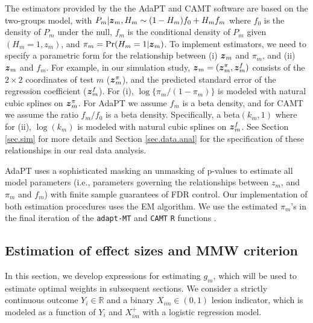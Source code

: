 \documentclass[bimj,fleqn]{w-art}
\newcommand{\mbf}[1]{\mbox{\boldmath${#1}$}}
\theoremstyle{plain}
\theoremstyle{definition}
\begin{document}
The estimators provided by the the AdaPT and CAMT software are based on the two-groups model, with $P_m|\mbf{z}_m,H_m \sim (1-H_m)f_0 + H_mf_m$ where $f_0$ is the density of $P_m$ under the null, $f_m$ is the conditional density of $P_m$ given $(H_m=1,z_m)$, and $\pi_m = \Pr(H_m=1|\mbf{z}_m)$. To implement estimators, we need to specify a parametric form for the relationship between (i) $\mbf{z}_m$ and $\pi_m$, and (ii) $\mbf{z}_m$ and $f_m$. For example, in our simulation study, $\mbf{z}_m = (\mbf{z}^\pi_{m},\mbf{z}^f_{m})$ consists of the $2\times 2$ coordinates of test $m$ ($\mbf{z}^\pi_{m}$), and the predicted standard error of the regression coefficient ($ \mbf{z}^f_{m}$). For (i), $\log\{\pi_m/(1-\pi_m)\}$ is modeled with natural cubic splines on $\mbf{z}^\pi_{m}$. For AdaPT we assume $f_m$ is a beta density, and for CAMT we assume the ratio $f_m/f_0$ is a beta density. Specifically, a beta$(k_m,1)$ where for (ii), $\log(k_m)$ is modeled with natural cubic splines on $\mbf{z}^f_{m}$. See Section \ref{sec.sim} for more details and Section \ref{sec.data.anal} for the specification of these relationships in our real data analysis.  

AdaPT uses a sophisticated masking an unmasking of p-values to estimate all model parameters (i.e., parameters governing the relationships between $z_m$, and $\pi_m$ and $f_m$) with finite sample guarantees of FDR control. Our implementation of both estimation procedures uses the EM algorithm. We use the estimated $\pi_m$'s in the final iteration of the \texttt{adapt-MT} and \texttt{CAMT} \texttt{R} functions \citep[see][and the package documentations for further details on their estimation procedures]{Lihua2018,Xianyang20}. 


\subsection{Estimation of effect sizes and MMW criterion}\label{sec.pow.est}

In this section, we develop expressions for estimating $g_m$, which will be used to estimate optimal weights in subsequent sections.  We consider a strictly continuous outcome $Y_i \in \mathbb{R}$ and a binary $X_{im}\in (0,1)$ lesion indicator, which is modeled as a function of $Y_i$ and $X_{im}^+$ with a logistic regression model.  
\end{document}

